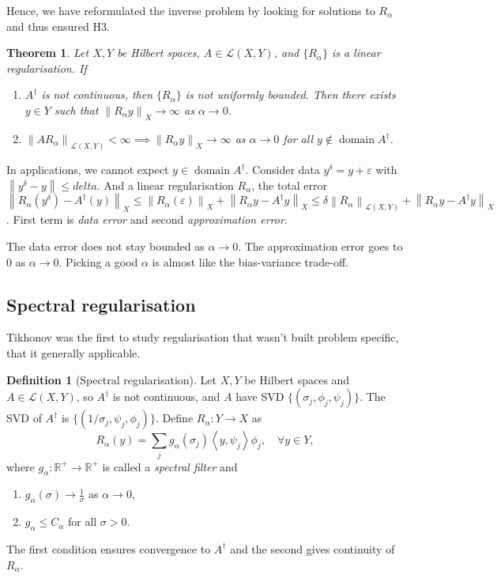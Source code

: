 \documentclass[12pt]{article}
\newtheorem{theorem}{Theorem}[section]
\theoremstyle{definition}
\newtheorem{definition}{Definition}[section]
\newcommand{\real}{\mathbb{R}}   %
\newcommand{\eps}{\varepsilon}    %
\DeclareMathOperator{\domain}{domain}
\newcommand\norm[1]{\left\lVert#1\right\rVert}
\newcommand\inner[2]{\left\langle#1, #2\right\rangle}
\begin{document}
Hence, we have reformulated the inverse problem by looking for solutions to $R_\alpha$ and thus ensured H3.

\begin{theorem}
    Let $X,Y$ be Hilbert spaces, $A\in \mathcal{L}(X,Y)$, and $\{R_\alpha\}$ is a linear regularisation. If 
    \begin{enumerate}[label=(\alph*)]
        \item $A^\dagger $ is not continuous, then $\{ R_{\alpha} \}$ is not uniformly bounded. Then there exists $y\in Y$ such that $\norm{R_{\alpha} y}_X \to \infty$ as $\alpha \to 0$. 
        \item $\norm{AR_\alpha}_{\mathcal{L}(X,Y)} < \infty \implies \norm{R_\alpha y}_X \to \infty$ as $\alpha \to 0$ for all $y \notin \domain A^\dagger $. 
    \end{enumerate}
\end{theorem}

In applications, we cannot expect $y\in \domain A^\dagger $. Consider data $y^\delta = y+ \eps$ with  $\norm{y^\delta - y}\leq delta$. And a linear regularisation $R_\alpha$, the total error $\norm{R_\alpha(y^\delta)-A^\dagger (y)}_X \leq \norm{R_\alpha(\eps)}_X + \norm{R_\alpha y - A^\dagger  y}_X \leq \delta \norm{R_\alpha}_{\mathcal{L}(X,Y)} + \norm{R_\alpha y - A^\dagger  y}_X$. First term is \textit{data error} and second \textit{approximation error}.

The data error does not stay bounded as $\alpha \to 0$. The approximation error goes to 0 as $\alpha\to 0$. Picking a good $\alpha$ is almost like the bias-variance trade-off.

\subsection{Spectral regularisation}
Tikhonov was the first to study regularisation that wasn't built problem specific, that it generally applicable. 

\begin{definition}[Spectral regularisation]
    Let $X,Y$ be Hilbert spaces and $A\in \mathcal{L}(X,Y)$, so $A^\dagger $ is not continuous, and $A$ have SVD $\{(\sigma_j,\phi_j, \psi_j)\}$. The SVD of $A^\dagger $ is $\{(1/\sigma_j,\psi_j, \phi_j)\}$. Define $R_\alpha:Y\to X$ as 
    \begin{equation*}
        R_\alpha(y) = \sum_j g_\alpha(\sigma_j)\inner{y}{\psi_j}\phi_j, \quad \forall y\in Y,
    \end{equation*} 
    where $g_\alpha:\real^{+} \to \real^+$ is called a \textit{spectral filter} and 
    \begin{enumerate}[label=(\alph*)]
        \item $g_\alpha(\sigma)\to \frac{1}{\sigma}$ as $\alpha\to 0$,
        \item $g_\alpha \leq C_\alpha$ for all $\sigma >0$.
    \end{enumerate}
    The first condition ensures convergence to $A^\dagger $ and the second gives continuity of $R_\alpha$.
\end{definition}
\end{document}
